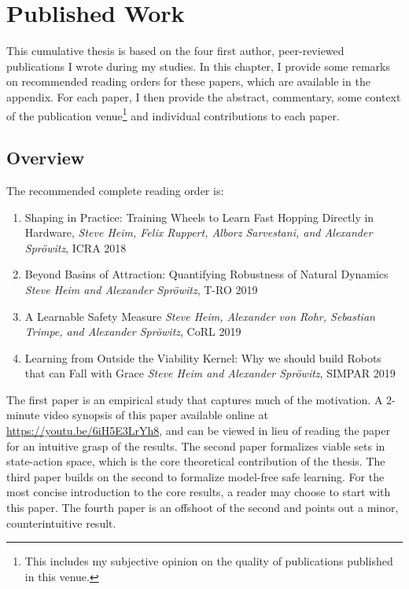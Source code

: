 
\chapter{Published Work} \label{chap:pubs}

This cumulative thesis is based on the four first author, peer-reviewed publications I wrote during my studies. In this chapter, I provide some remarks on recommended reading orders for these papers, which are available in the appendix. For each paper, I then provide the abstract, commentary, some context of the publication venue\footnote{This includes my subjective opinion on the quality of publications published in this venue.} and individual contributions to each paper.

\section{Overview}
The recommended complete reading order is:
\begin{enumerate}
    \item Shaping in Practice: Training Wheels to Learn Fast Hopping Directly in Hardware, \emph{Steve Heim, Felix Ruppert, Alborz Sarvestani, and Alexander Spr\"{o}witz}, ICRA 2018
    \item Beyond Basins of Attraction: Quantifying Robustness of Natural Dynamics \emph{Steve Heim and Alexander Spr\"{o}witz}, T-RO 2019
    \item A Learnable Safety Measure \emph{Steve Heim, Alexander von Rohr, Sebastian Trimpe, and Alexander Spr\"{o}witz}, CoRL 2019
    \item Learning from Outside the Viability Kernel: Why we should build Robots that can Fall with Grace \emph{Steve Heim and Alexander Spr\"{o}witz}, SIMPAR 2019
\end{enumerate}
The first paper is an empirical study that captures much of the motivation. A 2-minute video synopsis of this paper available online at \url{https://youtu.be/6iH5E3LrYh8}, and can be viewed in lieu of reading the paper for an intuitive grasp of the results. The second paper formalizes viable sets in state-action space, which is the core theoretical contribution of the thesis. The third paper builds on the second to formalize model-free safe learning. For the most concise introduction to the core results, a reader may choose to start with this paper. The fourth paper is an offshoot of the second and points out a minor, counterintuitive result.

